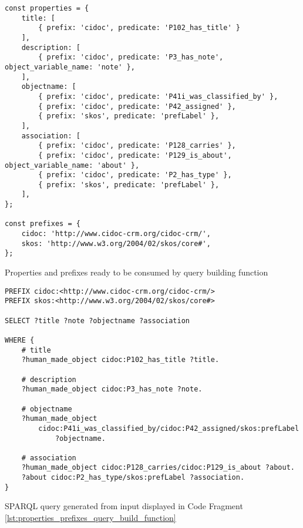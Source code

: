 %
%
%
\begin{listing}[htbp]
    \begin{verbatim}
const properties = {
    title: [
        { prefix: 'cidoc', predicate: 'P102_has_title' }
    ],
    description: [
        { prefix: 'cidoc', predicate: 'P3_has_note', object_variable_name: 'note' },
    ],
    objectname: [
        { prefix: 'cidoc', predicate: 'P41i_was_classified_by' },
        { prefix: 'cidoc', predicate: 'P42_assigned' },
        { prefix: 'skos', predicate: 'prefLabel' },
    ],
    association: [
        { prefix: 'cidoc', predicate: 'P128_carries' },
        { prefix: 'cidoc', predicate: 'P129_is_about', object_variable_name: 'about' },
        { prefix: 'cidoc', predicate: 'P2_has_type' },
        { prefix: 'skos', predicate: 'prefLabel' },
    ],
};

const prefixes = {
    cidoc: 'http://www.cidoc-crm.org/cidoc-crm/',
    skos: 'http://www.w3.org/2004/02/skos/core#',
};
    \end{verbatim}
    \caption{Properties and prefixes ready to be consumed by query building function}
    \label{lst:properties_prefixes_query_build_function}
\end{listing}
\begin{listing}[htbp]
    \begin{verbatim}
PREFIX cidoc:<http://www.cidoc-crm.org/cidoc-crm/>
PREFIX skos:<http://www.w3.org/2004/02/skos/core#>

SELECT ?title ?note ?objectname ?association

WHERE {
    # title
    ?human_made_object cidoc:P102_has_title ?title.
    
    # description
    ?human_made_object cidoc:P3_has_note ?note.
    
    # objectname
    ?human_made_object
        cidoc:P41i_was_classified_by/cidoc:P42_assigned/skos:prefLabel
            ?objectname.
    
    # association
    ?human_made_object cidoc:P128_carries/cidoc:P129_is_about ?about.
    ?about cidoc:P2_has_type/skos:prefLabel ?association.
}
    \end{verbatim}
    \caption{SPARQL query generated from input displayed in Code Fragment \ref{lst:properties_prefixes_query_build_function}}
    \label{lst:query_generated_edge_cases}
\end{listing}

